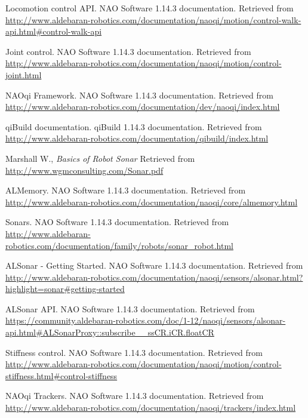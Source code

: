 \begin{thebibliography}{99}
	Locomotion control API.
	NAO Software 1.14.3 documentation.
	Retrieved from \url{http://www.aldebaran-robotics.com/documentation/naoqi/motion/control-walk-api.html#control-walk-api}

	Joint control.
	NAO Software 1.14.3 documentation.
	Retrieved from \url{http://www.aldebaran-robotics.com/documentation/naoqi/motion/control-joint.html}

	NAOqi Framework.
	NAO Software 1.14.3 documentation.
	Retrieved from \url{http://www.aldebaran-robotics.com/documentation/dev/naoqi/index.html}

	qiBuild documentation.
	qiBuild 1.14.3 documentation.
	Retrieved from \url{http://www.aldebaran-robotics.com/documentation/qibuild/index.html}

	Marshall W.,
	\emph{Basics of Robot Sonar}
	Retrieved from \url{http://www.wgmconsulting.com/Sonar.pdf}

	ALMemory. 
   	NAO Software 1.14.3 documentation. 
	Retrieved from \url{http://www.aldebaran-robotics.com/documentation/naoqi/core/almemory.html}

	Sonars.
	NAO Software 1.14.3 documentation. 
	Retrieved from \url{http://www.aldebaran-robotics.com/documentation/family/robots/sonar_robot.html}

	ALSonar - Getting Started.
	NAO Software 1.14.3 documentation.
	Retrieved from \url{http://www.aldebaran-robotics.com/documentation/naoqi/sensors/alsonar.html?highlight=sonar#getting-started}

	ALSonar API.
	NAO Software 1.14.3 documentation.
	Retrieved from \url{https://community.aldebaran-robotics.com/doc/1-12/naoqi/sensors/alsonar-api.html#ALSonarProxy::subscribe__ssCR.iCR.floatCR}

	Stiffness control.
	NAO Software 1.14.3 documentation.
	Retrieved from \url{http://www.aldebaran-robotics.com/documentation/naoqi/motion/control-stiffness.html#control-stiffness}

	NAOqi Trackers.
	NAO Software 1.14.3 documentation.
	Retrieved from \url{http://www.aldebaran-robotics.com/documentation/naoqi/trackers/index.html}
\end{thebibliography}
